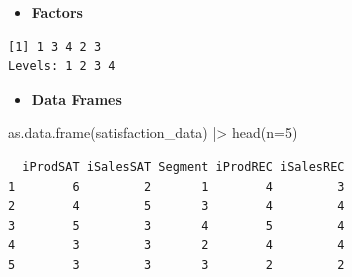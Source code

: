 \documentclass[
  ignorenonframetext,
]{beamer}
\newenvironment{Shaded}{\begin{snugshade}}{\end{snugshade}}
\newcommand{\AttributeTok}[1]{\textcolor[rgb]{0.40,0.45,0.13}{#1}}
\newcommand{\DecValTok}[1]{\textcolor[rgb]{0.68,0.00,0.00}{#1}}
\newcommand{\FunctionTok}[1]{\textcolor[rgb]{0.28,0.35,0.67}{#1}}
\newcommand{\NormalTok}[1]{\textcolor[rgb]{0.00,0.23,0.31}{#1}}
\newcommand{\SpecialCharTok}[1]{\textcolor[rgb]{0.37,0.37,0.37}{#1}}
\providecommand{\tightlist}{%
  \setlength{\itemsep}{0pt}\setlength{\parskip}{0pt}}\usepackage{longtable,booktabs,array}
\begin{document}
\begin{frame}[fragile]{}
\label{section-10}
\begin{itemize}
\tightlist
\item
  \textbf{Factors}
\end{itemize}

\tiny

\begin{Shaded}
\end{Shaded}

\begin{verbatim}
[1] 1 3 4 2 3
Levels: 1 2 3 4
\end{verbatim}

\normalsize

\begin{itemize}
\tightlist
\item
  \textbf{Data Frames}
\end{itemize}

\tiny

\begin{Shaded}
\begin{Highlighting}[]
\FunctionTok{as.data.frame}\NormalTok{(satisfaction\_data) }\SpecialCharTok{|\textgreater{}} \FunctionTok{head}\NormalTok{(}\AttributeTok{n=}\DecValTok{5}\NormalTok{)}
\end{Highlighting}
\end{Shaded}

\begin{verbatim}
  iProdSAT iSalesSAT Segment iProdREC iSalesREC
1        6         2       1        4         3
2        4         5       3        4         4
3        5         3       4        5         4
4        3         3       2        4         4
5        3         3       3        2         2
\end{verbatim}
\end{frame}
\end{document}
